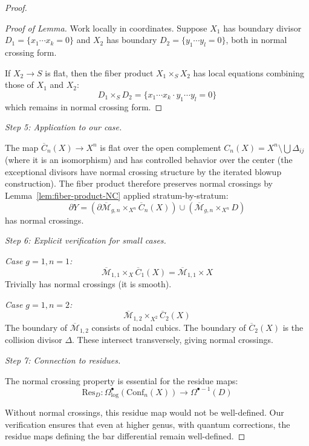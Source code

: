 \begin{proof}
\begin{proof}[Proof of Lemma]
Work locally in coordinates. Suppose $X_1$ has boundary divisor $D_1 = \{x_1 \cdots x_k = 0\}$
and $X_2$ has boundary $D_2 = \{y_1 \cdots y_l = 0\}$, both in normal crossing form.

If $X_2 \to S$ is flat, then the fiber product $X_1 \times_S X_2$ has local equations 
combining those of $X_1$ and $X_2$:
\[D_1 \times_S D_2 = \{x_1 \cdots x_k \cdot y_1 \cdots y_l = 0\}\]
which remains in normal crossing form.
\end{proof}

\emph{Step 5: Application to our case.}

The map $\overline{C}_n(X) \to X^n$ is flat over the open complement $C_n(X) = X^n \setminus \bigcup \Delta_{ij}$ (where it is an isomorphism) and has controlled behavior over the center (the exceptional divisors have normal crossing structure by the iterated blowup construction). The fiber product therefore preserves normal crossings by Lemma~\ref{lem:fiber-product-NC} applied stratum-by-stratum:
\[\partial Y = (\partial \overline{\mathcal{M}}_{g,n} \times_{X^n} \overline{C}_n(X)) 
\cup (\overline{\mathcal{M}}_{g,n} \times_{X^n} D)\]
has normal crossings.

\emph{Step 6: Explicit verification for small cases.}

\emph{Case $g=1, n=1$:} 
\[\overline{\mathcal{M}}_{1,1} \times_X \overline{C}_1(X) = \overline{\mathcal{M}}_{1,1} 
\times X\]
Trivially has normal crossings (it is smooth).

\emph{Case $g=1, n=2$:}
\[\overline{\mathcal{M}}_{1,2} \times_{X^2} \overline{C}_2(X)\]
The boundary of $\overline{\mathcal{M}}_{1,2}$ consists of nodal cubics. The boundary 
of $\overline{C}_2(X)$ is the collision divisor $\Delta$. These intersect transversely, 
giving normal crossings.

\emph{Step 7: Connection to residues.}

The normal crossing property is essential for the residue maps:
\[\text{Res}_D: \Omega^{\bullet}_{\log}(\text{Conf}_n(X)) \to \Omega^{\bullet-1}(D)\]

Without normal crossings, this residue map would not be well-defined. Our verification 
ensures that even at higher genus, with quantum corrections, the residue maps defining 
the bar differential remain well-defined.

\end{proof}

